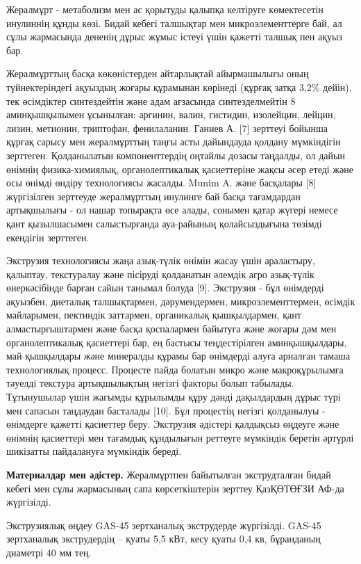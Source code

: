 \begin{multicols}{2}
Жералмұрт - метаболизм мен ас қорытуды қалыпқа келтіруге көмектесетін
инулиннің құнды көзі. Бидай кебегі талшықтар мен микроэлементтерге бай,
ал сұлы жармасында дененің дұрыс жұмыс істеуі үшін қажетті талшық пен
ақуыз бар.

Жералмұрттың басқа көкөністерден айтарлықтай айырмашылығы оның
түйнектеріндегі ақуыздың жоғары құрамынан көрінеді (құрғақ затқа 3,2\%
дейін), тек өсімдіктер синтездейтін және адам ағзасында синтезделмейтін
8 аминқышқылымен ұсынылған: аргинин, валин, гистидин, изолейцин, лейцин,
лизин, метионин, триптофан, фенилаланин. Ганиев А. {[}7{]} зерттеуі
бойынша құрғақ сарысу мен жералмұрттың таңғы асты дайындауда қолдану
мүмкіндігін зерттеген. Қолданылатын компоненттердің оңтайлы дозасы
таңдалды, ол дайын өнімнің физика-химиялық, органолептикалық
қасиеттеріне жақсы әсер етеді және осы өнімді өндіру технологиясы
жасалды. Munim A. және басқалары {[}8{]} жүргізілген зерттеуде
жералмұрттың инулинге бай басқа тағамдардан артықшылығы - ол нашар
топырақта өсе алады, сонымен қатар жүгері немесе қант қызылшасымен
салыстырғанда ауа-райының қолайсыздығына төзімді екендігін зерттеген.

Экструзия технологиясы жаңа азық-түлік өнімін жасау үшін араластыру,
қалыптау, текстуралау және пісіруді қолданатын әлемдік агро азық-түлік
өнеркәсібінде барған сайын танымал болуда {[}9{]}. Экструзия - бұл
өнімдерді ақуызбен, диеталық талшықтармен, дәрумендермен,
микроэлементтермен, өсімдік майларымен, пектиндік заттармен, органикалық
қышқылдармен, қант алмастырғыштармен және басқа қоспалармен байытуға
және жоғары дәм мен органолептикалық қасиеттері бар, ең бастысы
теңдестірілген аминқышқылдары, май қышқылдары және минералды құрамы бар
өнімдерді алуға арналған тамаша технологиялық процесс. Процесте пайда
болатын микро және макроқұрылымға тәуелді текстура артықшылықтың негізгі
факторы болып табылады. Тұтынушылар үшін жағымды құрылымды құру дәнді
дақылдардың дұрыс түрі мен сапасын таңдаудан басталады {[}10{]}. Бұл
процестің негізгі қолданылуы - өнімдерге қажетті қасиеттер беру.
Экструзия әдістері қалдықсыз өңдеуге және өнімнің қасиеттері мен
тағамдық құндылығын реттеуге мүмкіндік беретін әртүрлі шикізатты
пайдалануға мүмкіндік береді.

{\bfseries Материалдар мен әдістер.} Жералмұртпен байытылған экструдталған
бидай кебегі мен сұлы жармасының сапа көрсеткіштерін зерттеу ҚазҚӨТӨҒЗИ
АФ-да жүргізілді.

Экструзиялық өңдеу GAS-45 зертханалық экструдерде жүргізілді. GAS-45
зертханалық экструдердің -- қуаты 5,5 кВт, кесу қуаты 0,4 кв, бұранданың
диаметрі 40 мм тең.


\end{multicols}
